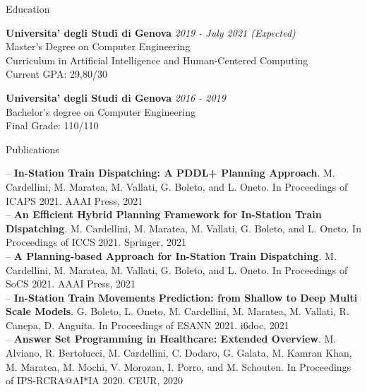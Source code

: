 \documentclass{resume} %
\begin{document}

\begin{rSection}{Education}

{\bf Universita' degli Studi di Genova} \hfill {\em 2019 - July 2021 (Expected)} \\ 
Master's Degree on Computer Engineering \\
Curriculum in Artificial Intelligence and Human-Centered Computing \\
Current GPA: 29,80/30

{\bf Universita' degli Studi di Genova} \hfill {\em 2016 - 2019} \\ 
Bachelor's degree on Computer Engineering \\
Final Grade: 110/110 \\


\end{rSection}



\begin{rSection}{Publications}

-- \textbf{In-Station Train Dispatching: A PDDL+ Planning Approach}. M. Cardellini, M. Maratea, M. Vallati, G. Boleto, and L. Oneto. In Proceedings of ICAPS 2021. AAAI Press, 2021 \\
-- \textbf{An Efficient Hybrid Planning Framework for In-Station Train Dispatching}. M. Cardellini, M. Maratea, M. Vallati, G. Boleto, and L. Oneto. In Proceedings of ICCS 2021. Springer, 2021 \\
-- \textbf{A Planning-based Approach for In-Station Train Dispatching}. M. Cardellini, M. Maratea, M. Vallati, G. Boleto, and L. Oneto. In Proceedings of SoCS 2021. AAAI Press, 2021\\
-- \textbf{In-Station Train Movements Prediction: from Shallow to Deep Multi Scale Models}. G. Boleto, L. Oneto, M. Cardellini, M. Maratea, M. Vallati, R. Canepa, D. Anguita. In Proceedings of ESANN 2021. i6doc, 2021\\
-- \textbf{Answer Set Programming in Healthcare: Extended Overview}. M. Alviano, R. Bertolucci, M. Cardellini, C. Dodaro, G. Galata, M. Kamran Khan, M. Maratea, M. Mochi, V. Morozan, I. Porro, and M. Schouten. In Proceedings of IPS-RCRA@AI*IA 2020. CEUR, 2020
	
\end{rSection}
\end{document}
